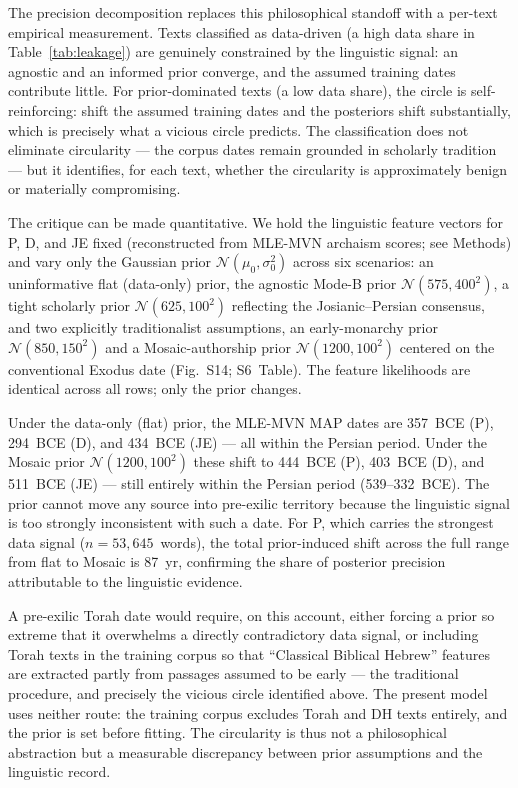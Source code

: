 \documentclass[10pt,letterpaper]{article}
\begin{document}
The precision decomposition replaces this philosophical standoff with
a per-text empirical measurement.  Texts classified as data-driven
(a high data share in Table~\ref{tab:leakage}) are genuinely constrained by the linguistic
signal: an agnostic and an informed prior converge, and the assumed
training dates contribute little.  For prior-dominated texts
(a low data share), the circle is self-reinforcing: shift the
assumed training dates and the posteriors shift substantially, which is
precisely what a vicious circle predicts.  The classification does not
eliminate circularity --- the corpus dates remain grounded in scholarly
tradition --- but it identifies, for each text, whether the circularity
is approximately benign or materially compromising.

The critique can be made quantitative.  We hold the linguistic feature
vectors for P, D, and JE fixed (reconstructed from MLE-MVN archaism
scores; see Methods) and vary only the Gaussian prior
$\mathcal{N}(\mu_0,\sigma_0^2)$ across six scenarios: an uninformative
flat (data-only) prior, the agnostic Mode-B prior
$\mathcal{N}(575,400^2)$, a tight scholarly prior
$\mathcal{N}(625,100^2)$ reflecting the Josianic--Persian consensus,
and two explicitly traditionalist assumptions, an early-monarchy prior
$\mathcal{N}(850,150^2)$ and a Mosaic-authorship prior
$\mathcal{N}(1200,100^2)$ centered on the conventional Exodus date
(Fig.~S14; S6~Table).  The feature likelihoods are identical across
all rows; only the prior changes.

Under the data-only (flat) prior, the MLE-MVN MAP dates are 357~BCE
(P), 294~BCE (D), and 434~BCE (JE) --- all within the Persian period.
Under the Mosaic prior $\mathcal{N}(1200,100^2)$ these shift to
444~BCE (P), 403~BCE (D), and 511~BCE (JE) --- still entirely within
the Persian period (539--332~BCE).  The prior cannot move any source
into pre-exilic territory because the linguistic signal is too
strongly inconsistent with such a date.  For P, which carries the
strongest data signal ($n = 53{,}645$~words), the total prior-induced
shift across the full range from flat to Mosaic is 87~yr, confirming
the share of posterior precision attributable to the linguistic evidence.

A pre-exilic Torah date would require, on this account, either forcing
a prior so extreme that it overwhelms a directly contradictory data
signal, or including Torah texts in the training corpus so that
``Classical Biblical Hebrew'' features are extracted partly from
passages assumed to be early --- the traditional procedure, and
precisely the vicious circle identified above.  The present model uses
neither route: the training corpus excludes Torah and DH texts
entirely, and the prior is set before fitting.  The circularity is
thus not a philosophical abstraction but a measurable discrepancy
between prior assumptions and the linguistic record.
\end{document}

